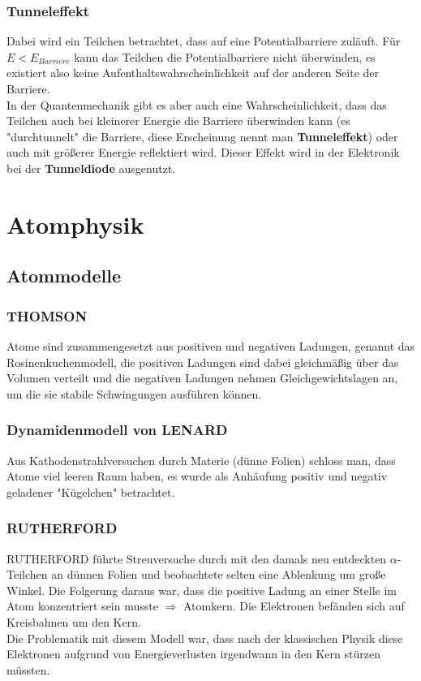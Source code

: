 \documentclass[12pt,a4paper,ngerman]{article}
\begin{document}
\pagebreak



\subsubsection{Tunneleffekt}

Dabei wird ein Teilchen betrachtet, dass auf eine Potentialbarriere zuläuft. Für $E < E_{Barriere}$ kann das Teilchen die Potentialbarriere nicht überwinden, es existiert also keine Aufenthaltswahrscheinlichkeit auf der anderen Seite der Barriere. \\
In der Quantenmechanik gibt es aber auch eine Wahrscheinlichkeit, dass das Teilchen auch bei kleinerer Energie die Barriere überwinden kann (es "durchtunnelt" die Barriere, diese Erscheinung nennt man \textbf{Tunneleffekt}) oder auch mit größerer Energie reflektiert wird. 
Dieser Effekt wird in der Elektronik bei der \textbf{Tunneldiode} ausgenutzt. 
 



\section{Atomphysik}
\subsection{Atommodelle}
\subsubsection*{THOMSON}
Atome sind zusammengesetzt aus positiven und negativen Ladungen, genannt das Rosinenkuchenmodell, die positiven Ladungen sind dabei gleichmäßig über das Volumen verteilt und die negativen Ladungen nehmen Gleichgewichtslagen an, um die sie stabile Schwingungen ausführen können. 

\subsubsection*{Dynamidenmodell von LENARD}
Aus Kathodenstrahlversuchen durch Materie (dünne Folien) schloss man, dass Atome viel leeren Raum haben, es wurde als Anhäufung positiv und negativ geladener "Kügelchen" betrachtet. 

\subsubsection*{RUTHERFORD}
RUTHERFORD führte Streuversuche durch mit den damals neu entdeckten $\alpha$-Teilchen an dünnen Folien und beobachtete selten eine Ablenkung um große Winkel. Die Folgerung daraus war, dass die positive Ladung an einer Stelle im Atom konzentriert sein musste $\Rightarrow$ Atomkern. Die Elektronen befänden sich auf Kreisbahnen um den Kern. \\
Die Problematik mit diesem Modell war, dass nach der klassischen Physik diese Elektronen aufgrund von Energieverlusten irgendwann in den Kern stürzen müssten.  
\end{document}
